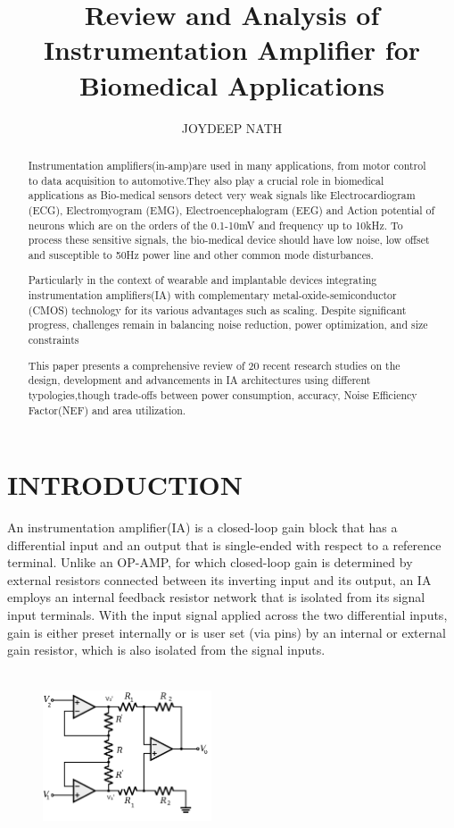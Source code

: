 \documentclass[]{article}
\title{Review and Analysis of Instrumentation Ampliﬁer for Biomedical  Applications}
\author{JOYDEEP NATH}
\affil{Department of ECE, Assam University,\\City- Silchar, Dist-Cachar, State - Assam, India}
\begin{document}
\maketitle


\begin{abstract}
	
		Instrumentation amplifiers(in-amp)are used in many applications,
		from motor control to data acquisition to automotive.They also play a crucial	role in biomedical applications as Bio-medical sensors detect very weak signals like Electrocardiogram (ECG), Electromyogram (EMG), Electroencephalogram (EEG) and Action potential of neurons which are on the orders of the 0.1-10mV and frequency up to 10kHz.
		To process these sensitive signals, the bio-medical device should have low noise, low offset and susceptible to 50Hz power line and other common mode disturbances.
		
	    Particularly in the context of wearable and implantable devices integrating instrumentation amplifiers(IA) with complementary metal-oxide-semiconductor (CMOS) technology for its various advantages such as scaling. Despite significant progress, challenges remain in balancing noise reduction, power optimization, and size constraints	
		
		This paper presents a comprehensive review of 20 recent research studies on the design, development and advancements in IA architectures using different typologies,though trade-offs between power consumption, accuracy, Noise Efficiency Factor(NEF) and area utilization.


\end{abstract}
\vspace{4cm}


\section{INTRODUCTION}

		An instrumentation amplifier(IA) is a closed-loop gain block that has a differential input and an output that is single-ended with respect to a reference terminal. Unlike an OP-AMP, for which closed-loop gain is determined
		by external resistors connected between its
		inverting input and its output, an IA employs an
		internal feedback resistor network that is isolated from its
		signal input terminals. With the input signal applied across
		the two differential inputs, gain is either preset internally
		or is user set (via pins) by an internal or external gain
		resistor, which is also isolated from the signal inputs.



\begin{figure}[H]
	\centering
	\includegraphics[width=5cm, height=5cm]{IA_DIAGRAM}
	\caption[Figure 1: Instrumentation amplifier]{}
	\label{fig:IA-CIRCUIT-DIAGRAM}
\end{figure}
\end{document}
